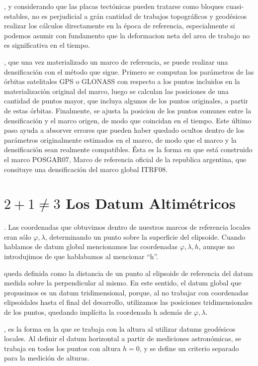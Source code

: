 \documentclass{tufte-book}
\begin{document}
, y considerando que las placas tectónicas pueden
tratarse como bloques cuasi-estables, no es perjudicial a grán cantidad de trabajos
topográficos y geodésicos realizar los cálculos directamente en la época de referencia,
especialmente si podemos asumir con fundamento que la deformacion neta del area de trabajo
no es significativa en el tiempo.

, que una vez materializado un
marco de referencia, se puede realizar una densificación con el método que sigue. Primero
se computan los parámetros de las órbitas satelitales GPS o GLONASS con respecto a los puntos incluidos
en la materialización original del marco, luego se calculan las posiciones de una cantidad
de puntos mayor, que incluya algunos de los puntos originales, a partir de estas órbitas.
Finalmente, se ajusta la posicion de los puntos comunes entre la densificación y el marco
origen, de modo que coincidan en el tiempo. Este último paso ayuda a absorver errores que
pueden haber quedado ocultos dentro de los parámetros originalmente estimados en el marco,
de modo que el marco y la densificación sean realmente compatibles. Ésta es la forma
en que está construido el marco POSGAR07, Marco de referencia oficial de la republica argentina,
que consituye una densificación del marco global ITRF08.

\section{\(2+1\neq3\) Los Datum Altimétricos }

. Las coordenadas que obtuvimos
dentro de nuestros marcos de referencia locales eran sólo \(\varphi,\lambda\), determinando un
punto sobre la superficie del elipsoide. Cuando hablamos de datum global mencionamos las coordenadas
\(\varphi,\lambda,h\), aunque no introdujimos de que hablabamos al mencionar ``h''.

 queda definida como la distancia de un punto al elipsoide
de referencia del datum medida sobre la perpendicular al mismo. En este sentido, el datum global
que propusimos es un datum tridimensional, porque, al no trabajar con coordenadas elipsoidales
hasta el final del desarrollo, utilizamos las posiciones tridimensionales de los puntos, quedando
implícita la coordenada h además de \(\varphi,\lambda\).

, es la forma en la que se trabaja con la altura
al utilizar datums geodésicos locales. Al definir el datum horizontal a partir de mediciones
astronómicas, se trabaja en todos los puntos con altura \(h=0\), y se define un criterio
separado para la medición de alturas.
\end{document}
